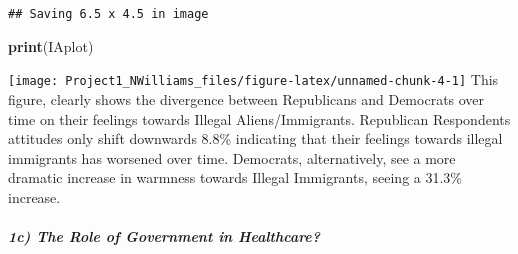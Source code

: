 \documentclass[
]{article}
\newenvironment{Shaded}{\begin{snugshade}}{\end{snugshade}}
\newcommand{\CommentTok}[1]{\textcolor[rgb]{0.56,0.35,0.01}{\textit{#1}}}
\newcommand{\ControlFlowTok}[1]{\textcolor[rgb]{0.13,0.29,0.53}{\textbf{#1}}}
\newcommand{\DataTypeTok}[1]{\textcolor[rgb]{0.13,0.29,0.53}{#1}}
\newcommand{\KeywordTok}[1]{\textcolor[rgb]{0.13,0.29,0.53}{\textbf{#1}}}
\newcommand{\NormalTok}[1]{#1}
\newcommand{\OperatorTok}[1]{\textcolor[rgb]{0.81,0.36,0.00}{\textbf{#1}}}
\newcommand{\StringTok}[1]{\textcolor[rgb]{0.31,0.60,0.02}{#1}}
\begin{document}
\begin{verbatim}
## Saving 6.5 x 4.5 in image
\end{verbatim}

\begin{Shaded}
\begin{Highlighting}[]
\KeywordTok{print}\NormalTok{(IAplot)}
\end{Highlighting}
\end{Shaded}

\texttt{[image: Project1\_NWilliams\_files/figure-latex/unnamed-chunk-4-1]}
This figure, clearly shows the divergence between Republicans and
Democrats over time on their feelings towards Illegal Aliens/Immigrants.
Republican Respondents attitudes only shift downwards 8.8\% indicating
that their feelings towards illegal immigrants has worsened over time.
Democrats, alternatively, see a more dramatic increase in warmness
towards Illegal Immigrants, seeing a 31.3\% increase.

\hypertarget{c-the-role-of-government-in-healthcare}{%
\subparagraph{1c) The Role of Government in
Healthcare?}\label{c-the-role-of-government-in-healthcare}}

\begin{Shaded}
\end{Shaded}
\end{document}
